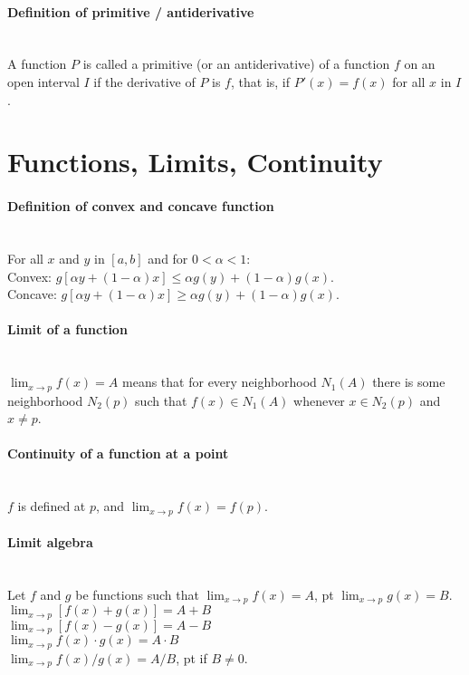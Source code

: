 \documentclass[10pt]{article}
\begin{document}
\paragraph{Definition of primitive / antiderivative}\ \\
A function $P$ is called a primitive (or an antiderivative) of a function $f$ on an open interval
$I$ if the derivative of $P$ is $f$, that is, if $P'(x) = f(x)$ for all $x$ in $I$.



\bigskip\bigskip
\section{Functions, Limits, Continuity}\smallskip

\paragraph{Definition of convex and concave function}\ \\
For all $x$ and $y$ in $[a, b]$ and for $0 < \alpha < 1$:\\
Convex: $g[\alpha y + (1-\alpha)x] \leq \alpha g(y) + (1 - \alpha) g(x)$.\\
Concave: $g[\alpha y + (1-\alpha)x] \geq \alpha g(y) + (1 - \alpha) g(x)$.

\paragraph{Limit of a function}\ \\
$\lim_{x \to p} f(x) = A$ means that for every neighborhood $N_1(A)$ there is some
neighborhood $N_2(p)$ such that $f(x) \in N_1(A)$ whenever $x \in N_2(p)$ and $x \neq p$.

\paragraph{Continuity of a function at a point}\ \\
$f$ is defined at $p$, and $\lim_{x \to p} f(x) = f(p)$.

\paragraph{Limit algebra}\ \\
Let $f$ and $g$ be functions such that $\lim_{x \to p} f(x) = A$,  pt $\lim_{x \to p} g(x) = B$.\\
$\lim_{x \to p} [f(x) + g(x)] = A + B$\\
$\lim_{x \to p} [f(x) - g(x)] = A - B$\\
$\lim_{x \to p} f(x) \cdot g(x) = A \cdot B$\\
$\lim_{x \to p} f(x) / g(x) = A/B$,  pt if $B \neq 0$.
\end{document}
